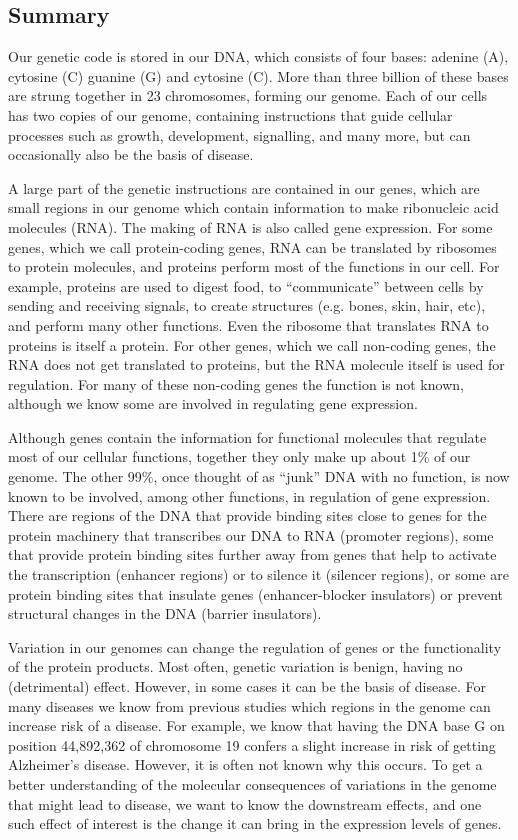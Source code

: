 \begin{appendices}

\chapter{Summary}
Our genetic code is stored in our DNA, which consists of four bases: adenine (A), cytosine (C) guanine (G) and cytosine (C). More than three billion of these bases are strung together in 23 chromosomes, forming our genome. Each of our cells has two copies of our genome, containing instructions that guide cellular processes such as growth, development, signalling, and many more, but can occasionally also be the basis of disease. 

A large part of the genetic instructions are contained in our genes, which are small regions in our genome which contain information to make ribonucleic acid molecules (RNA). The making of RNA is also called gene expression. For some genes, which we call protein-coding genes, RNA can be translated by ribosomes to protein molecules, and proteins perform most of the functions in our cell. For example, proteins are used to digest food, to “communicate” between cells by sending and receiving signals, to create structures (e.g. bones, skin, hair, etc), and perform many other functions. Even the ribosome that translates RNA to proteins is itself a protein. For other genes, which we call non-coding genes, the RNA does not get translated to proteins, but the RNA molecule itself is used for regulation. For many of these non-coding genes the function is not known, although we know some are involved in regulating gene expression.

Although genes contain the information for functional molecules that regulate most of our cellular functions, together they only make up about 1\% of our genome. The other 99\%, once thought of as “junk” DNA with no function, is now known to be involved, among other functions, in regulation of gene expression. There are regions of the DNA that provide binding sites close to genes for the protein machinery that transcribes our DNA to RNA (promoter regions), some that provide protein binding sites further away from genes that help to activate the transcription (enhancer regions) or to silence it (silencer regions), or some are protein binding sites that insulate genes (enhancer-blocker insulators) or prevent structural changes in the DNA (barrier insulators). 

Variation in our genomes can change the regulation of genes or the functionality of the protein products. Most often, genetic variation is benign, having no (detrimental) effect. However, in some cases it can be the basis of disease. For many diseases we know from previous studies which regions in the genome can increase risk of a disease. For example, we know that having the DNA base G on position 44,892,362 of chromosome 19 confers a slight increase in risk of getting Alzheimer’s disease. However, it is often not known why this occurs. To get a better understanding of the molecular consequences of variations in the genome that might lead to disease, we want to know the downstream effects, and one such effect of interest is the change it can bring in the expression levels of genes.


\end{appendices}
